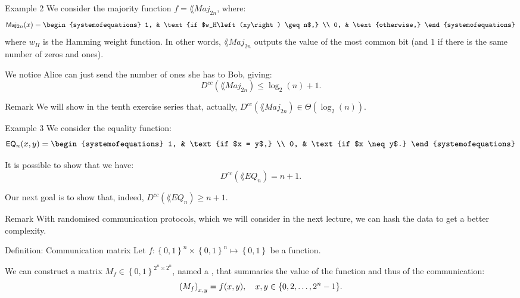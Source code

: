 \documentclass[a4paper]{article}
\begin{document}
\begin{parag}{Example 2}
    We consider the majority function $f = \lang{Maj}_{2n}$, where: 
    \[\lang{Maj}_{2n}\left(x\right) = \begin{systemofequations} 1, & \text{if $w_H\left(xy\right) \geq n$,} \\ 0, & \text{otherwise,} \end{systemofequations}\]
    where $w_H$ is the Hamming weight function. In other words, $\lang{Maj}_{2n}$ outputs the value of the most common bit (and $1$ if there is the same number of zeros and ones).

    We notice Alice can just send the number of ones she has to Bob, giving: 
    \[D^{cc}\left(\lang{Maj}_{2n}\right) \leq \log_2\left(n\right) + 1.\]

    \begin{subparag}{Remark}
        We will show in the tenth exercise series that, actually, $D^{cc}\left(\lang{Maj}_{2n}\right) \in \Theta\left(\log_2\left(n\right)\right)$.
    \end{subparag}
\end{parag}

\begin{parag}{Example 3}
    We consider the equality function: 
    \[\lang{EQ}_n\left(x, y\right) = \begin{systemofequations} 1, & \text{if $x = y$,} \\ 0, & \text{if $x \neq y$.} \end{systemofequations}\]

    It is possible to show that we have: 
    \[D^{cc}\left(\lang{EQ}_n\right) = n + 1.\]
    
    Our next goal is to show that, indeed, $D^{cc}\left(\lang{EQ}_n\right) \geq n + 1$.

    \begin{subparag}{Remark}
        With randomised communication protocols, which we will consider in the next lecture, we can hash the data to get a better complexity.
    \end{subparag}
\end{parag}

\begin{parag}{Definition: Communication matrix}
    Let $f : \left\{0, 1\right\}^n \times \left\{0, 1\right\}^n \mapsto \left\{0, 1\right\}$ be a function. 

    We can construct a matrix $M_f \in \left\{0, 1\right\}^{2^n \times 2^n}$, named a , that summaries the value of the function and thus of the communication: 
    \[\left(M_f\right)_{x, y} = f\left(x, y\right), \mathspace x, y \in \left\{0, 2, \ldots, 2^{n}- 1\right\}.\]
\end{parag}
\end{document}
